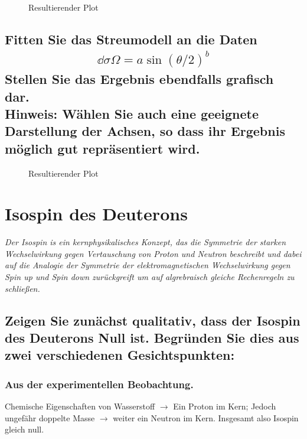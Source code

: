 \documentclass[ex, minted]{exercise_4.1}
\begin{document}
\dottedlinett

\begin{figure}[H]
    \centering
    
    \caption{Resultierender Plot}
\end{figure}

\subsection{Fitten Sie das Streumodell an die Daten 
\begin{align*}
    \dd \sigma \Omega = a \sin (\theta/2)^b
\end{align*} Stellen Sie das Ergebnis ebendfalls grafisch dar.\\
Hinweis: Wählen Sie auch eine geeignete Darstellung der Achsen, so dass ihr Ergebnis möglich gut repräsentiert wird.
}

\dottedlinett


\begin{figure}[H]
    \centering
    
    \caption{Resultierender Plot}
\end{figure}

\section{Isospin des Deuterons}
{\it Der Isospin is ein kernphysikalisches Konzept, das die Symmetrie der starken Wechselwirkung gegen Vertauschung von Proton und Neutron beschreibt und dabei auf die Analogie der Symmetrie der elektromagnetischen Wechselwirkung gegen Spin up und Spin down zurückgreift um auf algrebraisch gleiche Rechenregeln zu schließen.}

\subsection{Zeigen Sie zunächst qualitativ, dass der Isospin des Deuterons Null ist. Begründen Sie dies aus zwei verschiedenen Gesichtspunkten:}

\subsubsection{Aus der experimentellen Beobachtung.}

\dottedlinett

Chemische Eigenschaften von Wasserstoff \(\to\) Ein Proton im Kern; Jedoch ungefähr doppelte Masse \(\to\) weiter ein Neutron im Kern. Insgesamt also Isospin gleich null.
\end{document}
